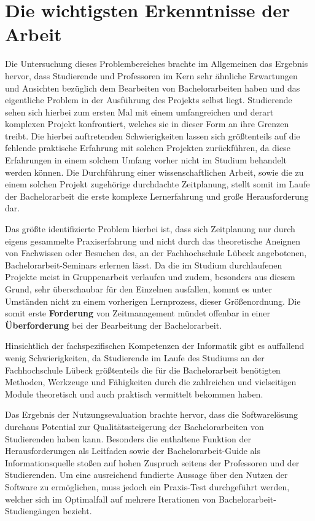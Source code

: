 \documentclass[bibliography=totoc,listof=totoc,BCOR=5mm,DIV=12,oneside]{scrbook}
\begin{document}
{\section{Die wichtigsten Erkenntnisse der Arbeit}
Die Untersuchung dieses Problembereiches brachte im Allgemeinen das Ergebnis hervor, dass Studierende und Professoren im Kern sehr ähnliche Erwartungen und Ansichten bezüglich dem Bearbeiten von Bachelorarbeiten haben und das eigentliche Problem in der Ausführung des Projekts selbst liegt. Studierende sehen sich hierbei zum ersten Mal mit einem umfangreichen und derart komplexen Projekt konfrontiert, welches sie in dieser Form an ihre Grenzen treibt. Die hierbei auftretenden Schwierigkeiten lassen sich größtenteils auf die fehlende praktische Erfahrung mit solchen Projekten zurückführen, da diese Erfahrungen in einem solchem Umfang vorher nicht im Studium behandelt werden können. Die Durchführung einer wissenschaftlichen Arbeit, sowie die zu einem solchen Projekt zugehörige durchdachte Zeitplanung, stellt somit im Laufe der Bachelorarbeit die erste komplexe Lernerfahrung und große Herausforderung dar.

\par \bigskip Das größte identifizierte Problem hierbei ist, dass sich Zeitplanung nur durch eigens gesammelte Praxiserfahrung und nicht durch das theoretische Aneignen von Fachwissen oder Besuchen des, an der Fachhochschule Lübeck angebotenen, Bachelorarbeit-Seminars erlernen lässt. Da die im Studium durchlaufenen Projekte meist in Gruppenarbeit verlaufen und zudem, besonders aus diesem Grund, sehr überschaubar für den Einzelnen ausfallen, kommt es unter Umständen nicht zu einem vorherigen Lernprozess, dieser Größenordnung. Die somit erste \textbf{Forderung} von Zeitmanagement mündet offenbar in einer \textbf{Überforderung} bei der Bearbeitung der Bachelorarbeit.
\par \bigskip Hinsichtlich der fachspezifischen Kompetenzen der Informatik gibt es auffallend wenig Schwierigkeiten, da Studierende im Laufe des Studiums an der Fachhochschule Lübeck größtenteils die für die Bachelorarbeit benötigten Methoden, Werkzeuge und Fähigkeiten durch die zahlreichen und vielseitigen Module theoretisch und auch praktisch vermittelt bekommen haben.

\par \bigskip Das Ergebnis der Nutzungsevaluation brachte hervor, dass die Softwarelösung durchaus Potential zur Qualitätssteigerung der Bachelorarbeiten von Studierenden haben kann. Besonders die enthaltene Funktion der Herausforderungen als Leitfaden sowie der Bachelorarbeit-Guide als Informationsquelle stoßen auf hohen Zuspruch seitens der Professoren und der Studierenden. Um eine ausreichend fundierte Aussage über den Nutzen der Software zu ermöglichen, muss jedoch ein Praxis-Test durchgeführt werden, welcher sich im Optimalfall auf mehrere Iterationen von Bachelorarbeit-Studiengängen bezieht.

}
\end{document}
